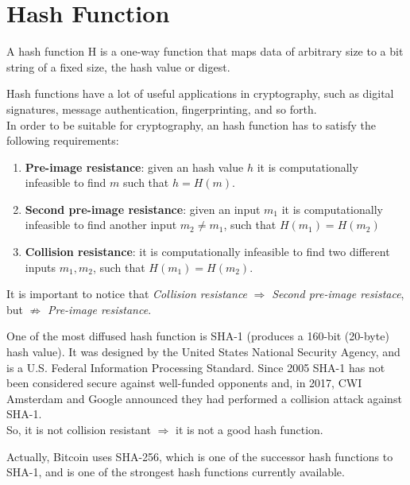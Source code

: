\section{Hash Function}
\begin{teorema}
	A hash function H is a one-way function that maps data of arbitrary size to a bit string of a fixed size, the hash value or digest.
\end{teorema}
Hash functions have a lot of useful applications in cryptography, such as digital signatures, message authentication, fingerprinting, and so forth.\\
In order to be suitable for cryptography, an hash function has to satisfy the following requirements:
\begin{enumerate}
	\item \textbf{Pre-image resistance}: given an hash value $h$ it is computationally infeasible to find $m$ such that $h=H(m)$.
	\item \textbf{Second pre-image resistance}: given an input $m_{1}$ it is computationally infeasible to find another input $m_{2}\neq m_{1}$, such that $H(m_{1})=H(m_{2})$
	\item \textbf{Collision resistance}: it is computationally infeasible to find two different inputs $m_{1}, m_{2}$, such that $H(m_{1})=H(m_{2})$.
\end{enumerate}

It is important to notice that \textit{Collision resistance} $\Rightarrow$ \textit{Second pre-image resistace}, but $\nRightarrow$ \textit{Pre-image resistance}.
\begin{example}
	One of the most diffused hash function is SHA-1 (produces a 160-bit (20-byte) hash value). It was designed by the United States National Security Agency, and is a U.S. Federal Information Processing Standard. Since 2005 SHA-1 has not been considered secure against well-funded opponents and, in 2017, CWI Amsterdam and Google announced they had performed a collision attack against SHA-1.\\
	So, it is not collision resistant $\Rightarrow$ it is not a good hash function.
\end{example}

Actually, Bitcoin uses SHA-256, which is one of the successor hash functions to SHA-1, and is one of the strongest hash functions currently available.
